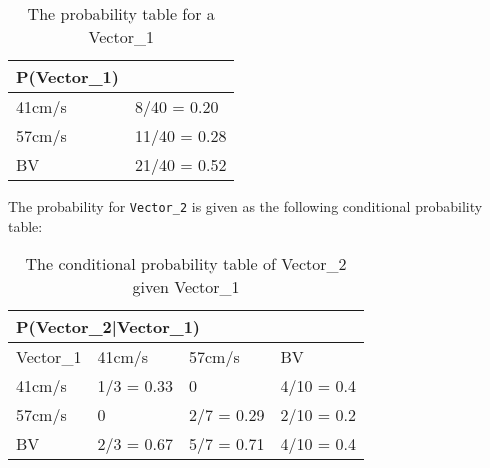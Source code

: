 \begin{table}[H]
\centering
\begin{tabular}{|l|l|}
\hline
P(Vector\_1) &\\ \hline
41cm/s & 8/40 = 0.20   \\ \hline 
57cm/s & 11/40 = 0.28  \\ \hline
BV & 21/40 = 0.52  \\ \hline
\end{tabular}
\caption{The probability table for a Vector\_1}
\label{Vector0Table}
\end{table}

The probability for \texttt{Vector\_2} is given as the following conditional
probability table:
\begin{table}[]
\centering
\begin{tabular}{|l|l|l|l|}
\hline
\multicolumn{4}{|l|}{P(Vector\_2|Vector\_1)} \\ \hline
 Vector\_1 & 41cm/s    & 57cm/s    & BV    \\ \hline
 41cm/s    & 1/3 = 0.33 & 0     & 4/10 = 0.4    \\ \hline
 57cm/s    & 0          & 2/7 = 0.29 & 2/10 = 0.2  \\ \hline
 BV        & 2/3 = 0.67 & 5/7 = 0.71 & 4/10 = 0.4  \\ \hline
\end{tabular}
\caption{The conditional probability table of Vector\_2 given Vector\_1}
\label{vector2tab}
\end{table}

